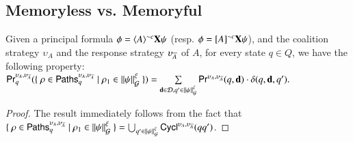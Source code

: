 \subsection{Memoryless vs. Memoryful}
\begin{proposition}\label{prop:one-step}Given a principal formula $\phi=\langle{A}\rangle^{\sim c}{\bf X}\psi$ (resp. $\phi=[{A}]^{\sim c}{\bf X}\psi$), and the coalition strategy $\upsilon_A$ and the response strategy
$\upsilon_{\overline{A}}$ of $A$, for every state $q\in Q$, we have the following property:
$\textsf{Pr}_q^{\upsilon_A,\upsilon_{\overline{A}}}(\{ \ \rho\in {\sf Paths}_q^{\upsilon_A,\upsilon_{\overline{A}}}\mid \rho_1\in\|{\psi}\|_{\mathcal{G}}^\xi \ \}) = \sum\limits_{{\bf d} \in\mathcal{D} , q'\in \|{\psi}\|_{\mathcal{G}}^\xi} \textsf{Pr}^{\upsilon_A,\upsilon_{\overline{A}}}(q,{\bf d})\cdot \delta(q,{\bf d},q').$

\end{proposition}
\begin{proof}
The result immediately follows from the fact that
$\{ \ \rho\in {\sf Paths}_q^{\upsilon_A,\upsilon_{\overline{A}}}\mid \rho_1\in\|{\psi}\|_{\mathcal{G}}^\xi \ \}=\bigcup_{q'\in \|{\psi}\|_{\mathcal{G}}^\xi}\textsf{Cycl}^{\upsilon_A,\upsilon_{\overline{A}}}(qq')$.
\end{proof}




